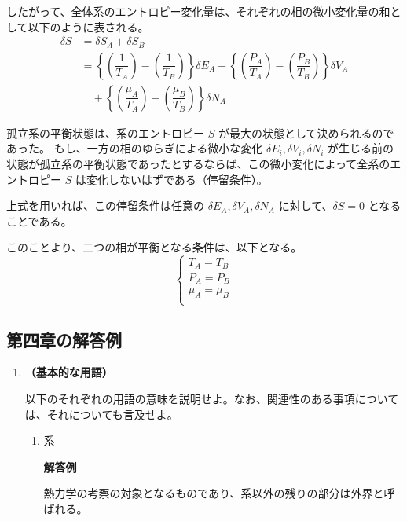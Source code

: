 \documentclass[uplatex,dvipdfmx,a4paper,11pt]{jsarticle}
\begin{document}
\begin{appendix}
\begin{enumerate}
したがって、全体系のエントロピー変化量は、それぞれの相の微小変化量の和として以下のように表される。
\begin{align*}
\delta S &= \delta S_A + \delta S_B \\
	&=\left\{ \left(\dfrac{1}{T_A} \right) - \left(\dfrac{1}{T_B} \right) \right\} \delta E_A
	+ \left\{ \left(\dfrac{P_A}{T_A} \right) - \left(\dfrac{P_B}{T_B} \right) \right\} \delta V_A \\
	&\quad + \left\{ \left(\dfrac{\mu_A}{T_A} \right) - \left(\dfrac{\mu_B}{T_B} \right) \right\} \delta N_A
\end{align*}

孤立系の平衡状態は、系のエントロピー $S$ が最大の状態として決められるのであった。
もし、一方の相のゆらぎによる微小な変化 $\delta E_i, \delta V_i, \delta N_i$ が生じる前の状態が孤立系の平衡状態であったとするならば、この微小変化によって全系のエントロピー $S$ は変化しないはずである（停留条件）。

上式を用いれば、この停留条件は任意の $\delta E_A, \delta V_A, \delta N_A$ に対して、$\delta S = 0$ となることである。

このことより、二つの相が平衡となる条件は、以下となる。
\begin{equation*}
\begin{cases}
T_A = T_B \\
P_A = P_B \\
\mu_A = \mu_B \\
\end{cases}
\end{equation*}

\end{enumerate}


\newpage

\subsection{第四章の解答例}

\begin{enumerate}

\item
{\bf （基本的な用語）}

以下のそれぞれの用語の意味を説明せよ。なお、関連性のある事項については、それについても言及せよ。

\begin{enumerate}
\item
系

{\bf 解答例}

熱力学の考察の対象となるものであり、系以外の残りの部分は外界と呼ばれる。


\end{enumerate}
\end{enumerate}
\end{appendix}
\end{document}
